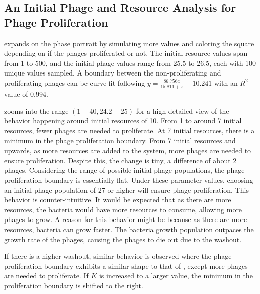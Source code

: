 \subsection{An Initial Phage and Resource Analysis for Phage Proliferation}
 expands on the phase portrait by simulating more values and coloring the square depending on if the phages proliferated or not. 
The initial resource values span from 1 to 500, and the initial phage values range from 25.5 to 26.5, each with 100 unique values sampled.
A boundary between the non-proliferating and proliferating phages can be curve-fit following $y=\frac{86.756x}{15.811+x} - 10.241$ with an $R^2$ value of 0.994. 

 zooms into the range $(1-40, 24.2-25)$ for a high detailed view of the behavior happening around initial resources of 10. 
From 1 to around 7 initial resources, fewer phages are needed to proliferate. 
At 7 initial resources, there is a minimum in the phage proliferation boundary. 
From 7 initial resources and upwards, as more resources are added to the system, more phages are needed to ensure proliferation. 
Despite this, the change is tiny, a difference of about 2 phages. 
Considering the range of possible initial phage populations, the phage proliferation boundary is essentially flat. 
Under these parameter values, choosing an initial phage population of 27 or higher will ensure phage proliferation. 
This behavior is counter-intuitive. 
It would be expected that as there are more resources, the bacteria would have more resources to consume, allowing more phages to grow. 
A reason for this behavior might be because as there are more resources, bacteria can grow faster. 
The bacteria growth population outpaces the growth rate of the phages, causing the phages to die out due to the washout. 

If there is a higher washout, similar behavior is observed where the phage proliferation boundary exhibits a similar shape to that of , except more phages are needed to proliferate. 
If $K$ is increased to a larger value, the minimum in the proliferation boundary is shifted to the right. 

